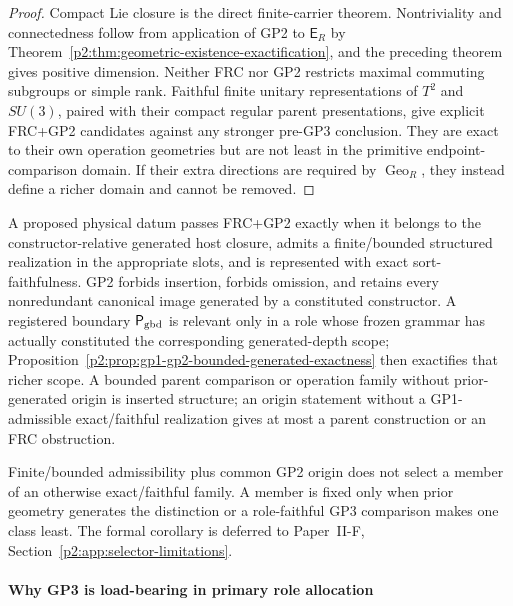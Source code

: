 \documentclass[12pt,a4paper]{article}
\begin{document}
\begin{proof}
Compact Lie closure is the direct finite-carrier theorem.  Nontriviality and
connectedness follow from application of GP2 to \(\mathsf E_R\) by
Theorem~\ref{p2:thm:geometric-existence-exactification}, and the preceding
theorem gives positive dimension.  Neither FRC nor GP2 restricts maximal commuting
subgroups or simple rank.  Faithful finite unitary representations of
\(T^2\) and \(SU(3)\), paired with their compact regular parent presentations,
give explicit FRC+GP2 candidates against any stronger pre-GP3 conclusion.
They are exact to their own operation geometries but are not least in the
primitive endpoint-comparison domain.  If their extra directions are required
by \(\operatorname{Geo}_R\), they instead define a richer domain and cannot be
removed.
\end{proof}

\begin{remark}
\label{p2:rem:gp1-gp2-bounded-origin-criterion}
A proposed physical datum passes FRC+GP2 exactly when it belongs to the
constructor-relative generated host closure, admits a finite/bounded structured
realization in the appropriate slots, and is represented with exact
sort-faithfulness.  GP2 forbids insertion, forbids omission, and retains every
nonredundant canonical image generated by a constituted constructor.  A
registered boundary \(\mathsf P_{\rm gbd}\) is relevant only in a role whose
frozen grammar has actually constituted the corresponding generated-depth
scope; Proposition~\ref{p2:prop:gp1-gp2-bounded-generated-exactness} then
exactifies that richer scope.  A bounded parent comparison or operation family
without prior-generated origin is inserted structure; an origin statement
without a GP1-admissible exact/faithful realization gives at most a parent
construction or an FRC obstruction.
\end{remark}

\begin{remark}
\label{p2:rem:gp1-gp2-family-selection-pointer}
Finite/bounded admissibility plus common GP2 origin does not select a member of
an otherwise exact/faithful family.  A member is fixed only when prior geometry
generates the distinction or a role-faithful GP3 comparison makes one class
least.  The formal corollary is deferred to
Paper~II-F, Section~\ref{p2:app:selector-limitations}.
\end{remark}

\paragraph{Why GP3 is load-bearing in primary role allocation}
\end{document}
